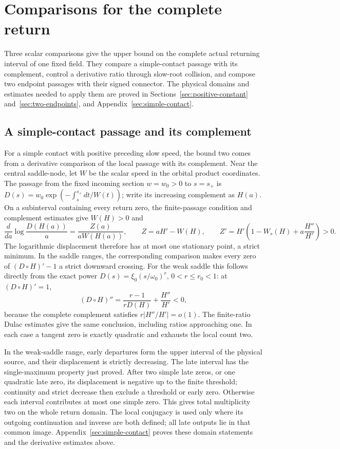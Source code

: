 \section{Comparisons for the complete return}\label{sec:return-comparisons}\label{sec:counting}

Three scalar comparisons give the upper bound on the complete actual
returning interval of one fixed field. They compare a simple-contact
passage with its complement, control a derivative ratio through slow-root
collision, and compose two endpoint passages with their signed connector.
The physical domains and estimates needed to apply them are proved in
Sections~\ref{sec:positive-constant} and~\ref{sec:two-endpoints}, and
Appendix~\ref{sec:simple-contact}.

\subsection{A simple-contact passage and its complement}
\label{subsec:simple-comparison-core}
For a simple contact with positive preceding slow speed, the bound two
comes from a derivative comparison of the local passage with its
complement. Near the central saddle-node, let $W$ be the scalar
speed in the orbital product coordinates. The passage from the fixed
incoming section $w=w_0>0$ to $s=s_+$ is
$D(s)=w_0\exp(-\int_s^{s_+}dt/W(t))$; write its increasing
complement as $H(a)$. On a subinterval containing every return zero,
the finite-passage condition and complement estimates give $W(H)>0$ and
\[
 \frac{d}{da}\log\frac{D(H(a))}{a}
   =\frac{Z(a)}{aW(H(a))},\qquad
 Z=aH'-W(H),\qquad
 Z'=H'\left(1-W_s(H)+a\frac{H''}{H'}\right)>0.
\]
The logarithmic displacement therefore has at most one stationary
point, a strict minimum. In the saddle ranges, the corresponding
comparison makes every zero of $(D\circ H)'-1$ a strict downward
crossing. For the weak saddle this follows directly from the exact
power $D(s)=\xi_0(s/\omega_0)^r$, $0<r\leq r_0<1$: at $(D\circ H)'=1$,
\[
 (D\circ H)''=\frac{r-1}{rD(H)}+\frac{H''}{H'}<0,
\]
because the complete complement satisfies $r|H''/H'|=o(1)$.
The finite-ratio Dulac estimates give the same conclusion, including
ratios approaching one. In each case a tangent zero is exactly
quadratic and exhausts the local count two.

In the weak-saddle range, early departures form the upper interval
of the physical source, and their displacement is strictly decreasing.
The late interval has the single-maximum property just proved.
After two simple late zeros, or one quadratic late zero, its displacement
is negative up to the finite threshold; continuity and strict decrease
then exclude a threshold or early zero. Otherwise each interval
contributes at most one simple zero. This gives total multiplicity two
on the whole return domain. The local conjugacy is used only where its
outgoing continuation and inverse are both defined; all late outputs
lie in that common image. Appendix~\ref{sec:simple-contact} proves
these domain statements and the derivative estimates above.

